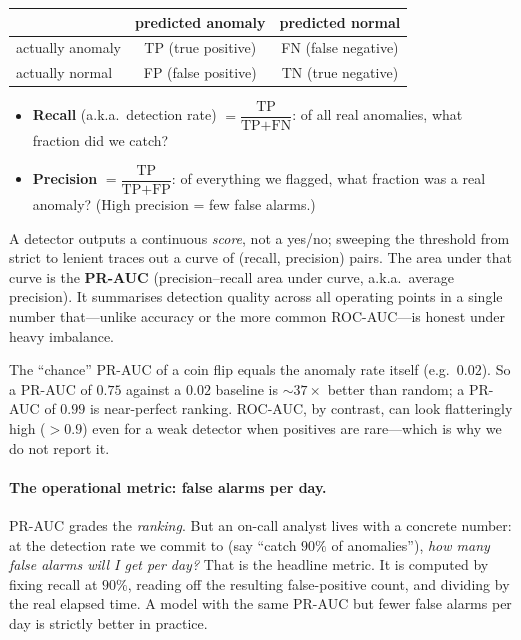 \documentclass[11pt,a4paper]{article}
\newcommand{\keyword}[1]{\textbf{\color{accent}#1}}
\begin{document}
\begin{table}[H]\centering\small
\begin{tabular}{@{}l cc@{}}
\toprule
 & predicted anomaly & predicted normal\\
\midrule
actually anomaly & TP (true positive) & FN (false negative)\\
actually normal & FP (false positive) & TN (true negative)\\
\bottomrule
\end{tabular}
\end{table}

\begin{itemize}[nosep,leftmargin=1.5em]
  \item \keyword{Recall} (a.k.a.\ detection rate) $=\dfrac{\text{TP}}{\text{TP}+\text{FN}}$:
  of all real anomalies, what fraction did we catch?
  \item \keyword{Precision} $=\dfrac{\text{TP}}{\text{TP}+\text{FP}}$: of everything
  we flagged, what fraction was a real anomaly? (High precision = few false
  alarms.)
\end{itemize}

A detector outputs a continuous \emph{score}, not a yes/no; sweeping the
threshold from strict to lenient traces out a curve of (recall, precision) pairs.
The area under that curve is the \keyword{PR-AUC} (precision--recall area under
curve, a.k.a.\ average precision). It summarises detection quality across all
operating points in a single number that---unlike accuracy or the more common
ROC-AUC---is honest under heavy imbalance.

\begin{intuition}
The ``chance'' PR-AUC of a coin flip equals the anomaly rate itself (e.g.\
$0.02$). So a PR-AUC of $0.75$ against a $0.02$ baseline is $\sim$$37\times$
better than random; a PR-AUC of $0.99$ is near-perfect ranking. ROC-AUC, by
contrast, can look flatteringly high ($>0.9$) even for a weak detector when
positives are rare---which is why we do not report it.
\end{intuition}

\paragraph{The operational metric: false alarms per day.} PR-AUC grades the
\emph{ranking}. But an on-call analyst lives with a concrete number: at the
detection rate we commit to (say ``catch $90\%$ of anomalies''), \emph{how many
false alarms will I get per day?} That is the headline metric. It is computed by
fixing recall at $90\%$, reading off the resulting false-positive count, and
dividing by the real elapsed time. A model with the same PR-AUC but fewer false
alarms per day is strictly better in practice.
\end{document}
